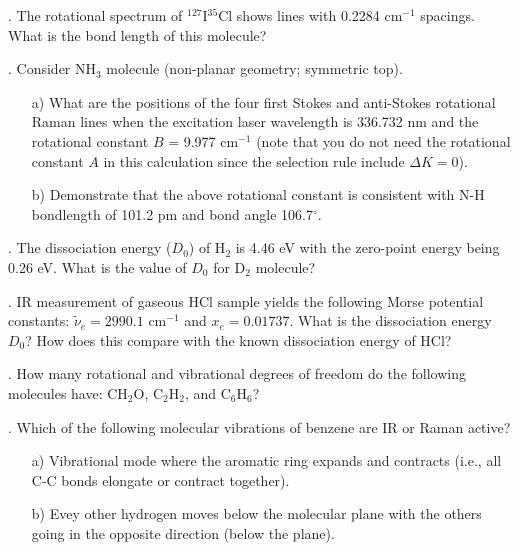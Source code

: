 
. The rotational spectrum of $^{127}$I$^{35}$Cl shows lines with 0.2284 cm$^{-1}$ spacings. What is the bond length of this molecule?\\


. Consider NH$_3$ molecule (non-planar geometry; symmetric top).

\begin{itemize}
\item[a)] What are the positions of the four first Stokes and anti-Stokes rotational Raman lines when the excitation laser wavelength is 336.732 nm and the rotational constant $B$ = 9.977 cm$^{-1}$ (note that you do not need the rotational constant $A$ in this calculation since the selection rule include $\Delta K = 0$).

\item[b)] Demonstrate that the above rotational constant is consistent with N-H bondlength of 101.2 pm and bond angle 106.7$^\circ$. 

\end{itemize}


. The dissociation energy ($D_0$) of H$_2$ is 4.46 eV with the zero-point energy being 0.26 eV. What is the value of $D_0$ for D$_2$ molecule?\\


. IR measurement of gaseous HCl sample yields the following Morse potential constants: $\tilde{\nu}_e = 2990.1$ cm$^{-1}$ and $x_e = 0.01737$. What is the dissociation energy $D_0$? How does this compare with the known dissociation energy of HCl?\\


. How many rotational and vibrational degrees of freedom do the following molecules have: CH$_2$O, C$_2$H$_2$, and C$_6$H$_6$?\\


. Which of the following molecular vibrations of benzene are IR or Raman active?

\begin{itemize}
\item[a)] Vibrational mode where the aromatic ring expands and contracts (i.e., all C-C bonds elongate or contract together).
\item[b)] Evey other hydrogen moves below the molecular plane with the others going in the opposite direction (below the plane).
\end{itemize}

